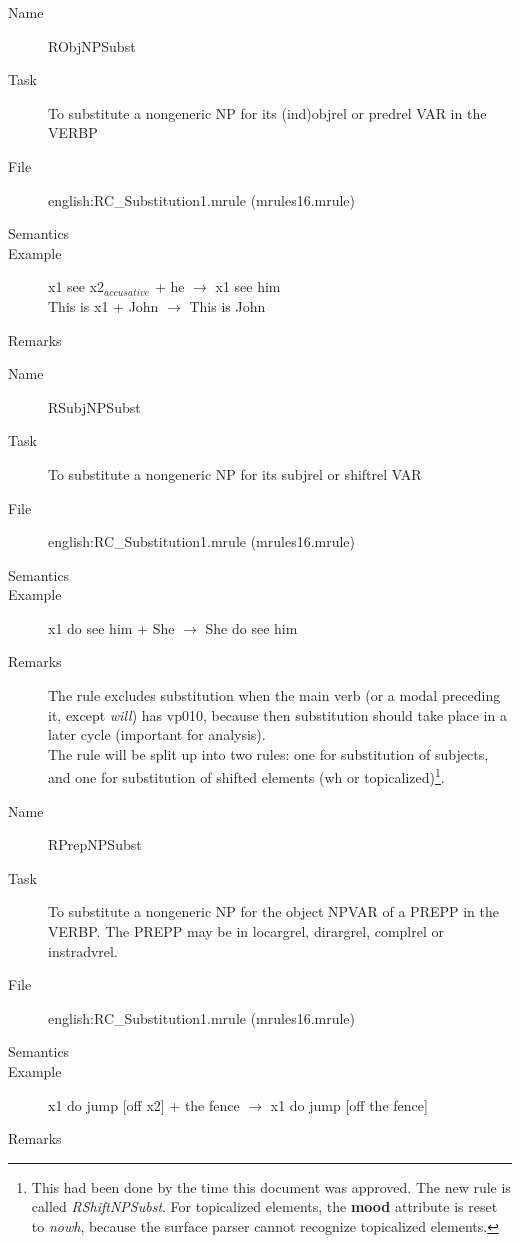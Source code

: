 \begin{description}
\vspace{1 cm}
\begin{description}
\item[Name] RObjNPSubst
\item[Task] To substitute a nongeneric NP for its (ind)objrel or predrel VAR 
in the VERBP
\item[File] english:RC\_Substitution1.mrule (mrules16.mrule)
\item[Semantics]
\item[Example] x1 see x2$_{accusative}$ + he $\rightarrow$ x1 see him\\
This is x1 + John $\rightarrow$ This is John
\item[Remarks] 
\end{description}

\vspace{1 cm}
\begin{description}
\item[Name] RSubjNPSubst
\item[Task] To substitute a nongeneric NP for its subjrel or shiftrel VAR
\item[File] english:RC\_Substitution1.mrule (mrules16.mrule)
\item[Semantics]
\item[Example] x1 do see him + She $\rightarrow$ She do see him
\item[Remarks] The rule excludes substitution when the main verb (or a modal 
preceding it, except {\em will\/}) has vp010, because then substitution should 
take place in a later cycle (important for analysis).\\
The rule will be split up into two rules: one for substitution 
of subjects, and one for substitution of shifted elements (wh or 
topicalized)\footnote{This had been done by the time this document was 
approved. The new rule is called {\em RShiftNPSubst\/}. For topicalized 
elements, the {\bf mood} attribute is reset to {\em nowh\/}, because the 
surface parser cannot recognize topicalized elements.}.
\end{description}

\vspace{1 cm}
\begin{description}
\item[Name] RPrepNPSubst
\item[Task] To substitute a nongeneric NP for the object NPVAR of a PREPP in 
the VERBP. The PREPP may be in locargrel, dirargrel, complrel or 
instr\-adv\-rel.
\item[File] english:RC\_Substitution1.mrule (mrules16.mrule)
\item[Semantics]
\item[Example] x1 do jump [off x2] + the fence $\rightarrow$ x1 do jump [off 
the fence]
\item[Remarks] 
\end{description}


\end{description}
